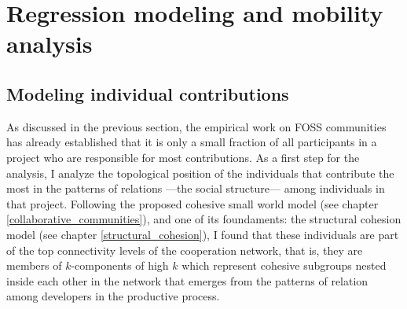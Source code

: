 \section{Regression modeling and mobility analysis}

\subsection{Modeling individual contributions}

As discussed in the previous section, the empirical work on FOSS communities has already established that it is only a small fraction of all participants in a project who are responsible for most contributions. As a first step for the analysis, I analyze the topological position of the individuals that contribute the most in the patterns of relations ---the social structure--- among individuals in that project. Following the proposed cohesive small world model (see chapter \ref{collaborative_communities}), and one of its foundaments: the structural cohesion model \citep{moody:2003} (see chapter \ref{structural_cohesion}), I found that these individuals are part of the top connectivity levels of the cooperation network, that is, they are members of $k$-components of high $k$ which represent cohesive subgroups nested inside each other in the network that emerges from the patterns of relation among developers in the productive process. 

